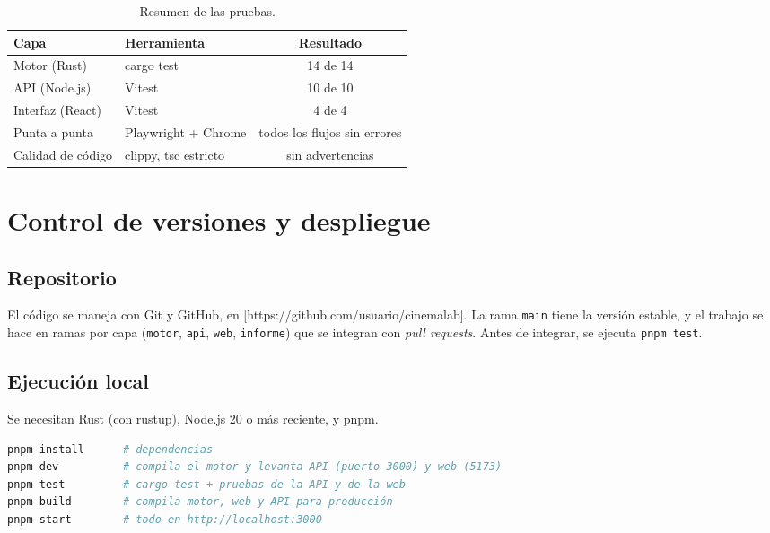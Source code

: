 \documentclass[11pt,letterpaper]{article}
\newcommand{\pend}[1]{\textcolor{orange!80!black}{[#1]}}
\begin{document}
\begin{table}[H]
\centering
\small
\begin{tabular}{@{}llc@{}}
\toprule
\textbf{Capa} & \textbf{Herramienta} & \textbf{Resultado} \\
\midrule
Motor (Rust) & cargo test & 14 de 14 \\
API (Node.js) & Vitest & 10 de 10 \\
Interfaz (React) & Vitest & 4 de 4 \\
Punta a punta & Playwright + Chrome & todos los flujos sin errores \\
Calidad de código & clippy, tsc estricto & sin advertencias \\
\bottomrule
\end{tabular}
\caption{Resumen de las pruebas.}
\end{table}

\section{Control de versiones y despliegue}

\subsection{Repositorio}

El código se maneja con Git y GitHub, en \pend{https://github.com/usuario/cinemalab}. La rama \texttt{main} tiene la versión estable, y el trabajo se hace en ramas por capa (\texttt{motor}, \texttt{api}, \texttt{web}, \texttt{informe}) que se integran con \emph{pull requests}. Antes de integrar, se ejecuta \texttt{pnpm test}.

\subsection{Ejecución local}

Se necesitan Rust (con rustup), Node.js 20 o más reciente, y pnpm.

\begin{lstlisting}[language=bash,caption={Comandos del proyecto.}]
pnpm install      # dependencias
pnpm dev          # compila el motor y levanta API (puerto 3000) y web (5173)
pnpm test         # cargo test + pruebas de la API y de la web
pnpm build        # compila motor, web y API para producción
pnpm start        # todo en http://localhost:3000
\end{lstlisting}
\end{document}
